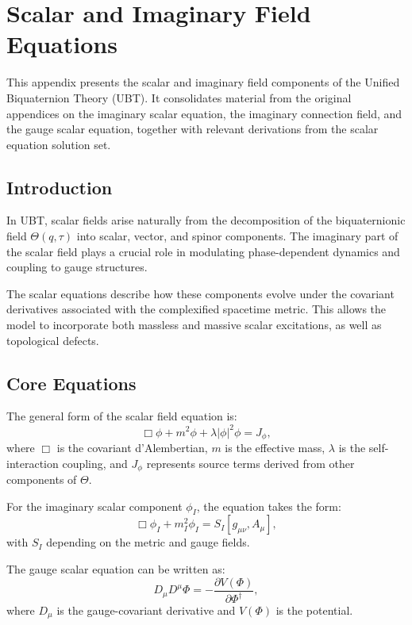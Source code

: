 
\section{Scalar and Imaginary Field Equations}

This appendix presents the scalar and imaginary field components of the Unified
Biquaternion Theory (UBT). It consolidates material from the original appendices
on the imaginary scalar equation, the imaginary connection field, and the gauge
scalar equation, together with relevant derivations from the scalar equation
solution set.

\subsection{Introduction}

In UBT, scalar fields arise naturally from the decomposition of the
biquaternionic field $\Theta(q,\tau)$ into scalar, vector, and spinor
components. The imaginary part of the scalar field plays a crucial role in
modulating phase-dependent dynamics and coupling to gauge structures.

The scalar equations describe how these components evolve under the covariant
derivatives associated with the complexified spacetime metric. This allows the
model to incorporate both massless and massive scalar excitations, as well as
topological defects.

\subsection{Core Equations}

The general form of the scalar field equation is:
\begin{equation}
  \Box \phi + m^2 \phi + \lambda |\phi|^2 \phi = J_\phi ,
\end{equation}
where $\Box$ is the covariant d'Alembertian, $m$ is the effective mass, $\lambda$
is the self-interaction coupling, and $J_\phi$ represents source terms derived
from other components of $\Theta$.

For the imaginary scalar component $\phi_I$, the equation takes the form:
\begin{equation}
  \Box \phi_I + m_I^2 \phi_I = S_I[g_{\mu\nu}, A_\mu] ,
\end{equation}
with $S_I$ depending on the metric and gauge fields.

The gauge scalar equation can be written as:
\begin{equation}
  D_\mu D^\mu \Phi = - \frac{\partial V(\Phi)}{\partial \Phi^\dagger} ,
\end{equation}
where $D_\mu$ is the gauge-covariant derivative and $V(\Phi)$ is the potential.

